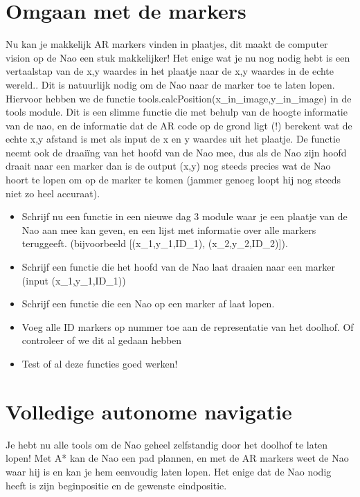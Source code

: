 \documentclass[a4paper]{article}
\begin{document}
\section{Omgaan met de markers}

Nu kan je makkelijk AR markers vinden in plaatjes, dit maakt de computer vision op de Nao een stuk makkelijker! Het enige wat je nu nog nodig hebt is een vertaalstap van de x,y waardes in het plaatje naar de x,y waardes in de echte wereld.. Dit is natuurlijk nodig om de Nao naar de marker toe te laten lopen. Hiervoor hebben we de functie tools.calcPosition(x\_in\_image,y\_in\_image) in de tools module. Dit is een slimme functie die met behulp van de hoogte informatie van de nao, en de informatie dat de AR code op de grond ligt (!) berekent wat de echte x,y afstand is met als input de x en y waardes uit het plaatje. De functie neemt ook de draaiïng van het hoofd van de Nao mee, dus als de Nao zijn hoofd draait naar een marker dan is de output (x,y) nog steeds precies wat de Nao hoort te lopen om op de marker te komen (jammer genoeg loopt hij nog steeds niet zo heel accuraat).

\begin{Exercise}
\begin{itemize}
\item Schrijf nu een functie in een nieuwe dag 3 module waar je een plaatje van de Nao aan mee kan geven, en een lijst met informatie over alle markers teruggeeft. (bijvoorbeeld [(x\_1,y\_1,ID\_1), (x\_2,y\_2,ID\_2)]).
\item Schrijf een functie die het hoofd van de Nao laat draaien naar een marker (input (x\_1,y\_1,ID\_1))
\item Schrijf een functie die een Nao op een marker af laat lopen.
\item Voeg alle ID markers op nummer toe aan de representatie van het doolhof. Of controleer of we dit al gedaan hebben
\item Test of al deze functies goed werken!
\end{itemize}
\end{Exercise}
\vspace{10 mm}



\section{Volledige autonome navigatie}

Je hebt nu alle tools om de Nao geheel zelfstandig door het doolhof te laten lopen! Met A* kan de Nao een pad plannen, en met de AR markers weet de Nao waar hij is en kan je hem eenvoudig laten lopen. Het enige dat de Nao nodig heeft is zijn beginpositie en de gewenste eindpositie.
\end{document}
